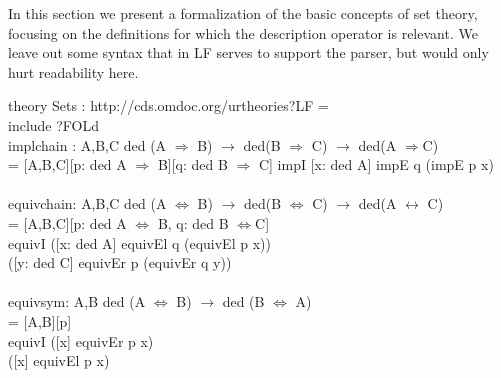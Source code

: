 \documentclass{article}
\begin{document}
In this section we present a formalization of the basic concepts of set theory, focusing on the definitions for which the description operator is relevant. We leave out some syntax that in LF serves to support the parser, but would only hurt readability here.\\

\begin{listing}
theory Sets : http://cds.omdoc.org/urtheories?LF = \\
  include ?FOLd\\
  implchain : {A,B,C} ded (A $\Rightarrow$ B) $\rightarrow$ ded(B $\Rightarrow$ C) $\rightarrow$ ded(A $\Rightarrow$C) \\
  	= [A,B,C][p: ded A $\Rightarrow$ B][q: ded B $\Rightarrow$ C] impI [x: ded A] impE q (impE p x)\\
  \\
  equivchain: {A,B,C} ded (A $\Leftrightarrow$ B) $\rightarrow$ ded(B $\Leftrightarrow$ C) $\rightarrow$ ded(A $\leftrightarrow$ C) \\
  = [A,B,C][p: ded A $\Leftrightarrow$ B, q: ded B $\Leftrightarrow$C] \\
  equivI ([x: ded A] equivEl q (equivEl p x))\\
  		 ([y: ded C] equivEr p (equivEr q y))\\
\\
  equivsym: {A,B} ded (A $\Leftrightarrow$ B) $\rightarrow$ ded (B $\Leftrightarrow$ A) \\
  = [A,B][p] \\
  equivI ([x] equivEr p x)\\
         ([x] equivEl p x)\\
\end{listing}
\end{document}
